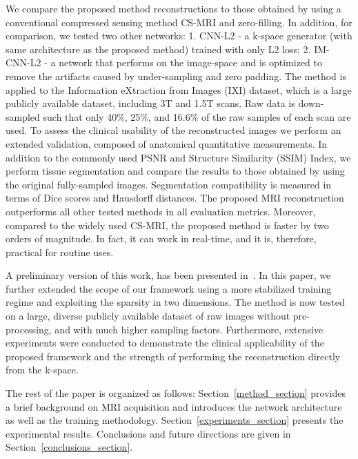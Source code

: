 \documentclass[10pt,journal,compsoc]{IEEEtran}
\begin{document}
We compare the proposed method reconstructions to those obtained by using a conventional compressed sensing method CS-MRI \cite{lustig2007sparse} and zero-filling. In addition, for comparison, we tested two other networks: 1. CNN-L2 - a k-space generator (with same architecture as the proposed method) trained with only L2 loss; 2. IM-CNN-L2 - a network that performs on the image-space and is optimized to remove the artifacts caused by under-sampling and zero padding.
The method is applied to the Information eXtraction from Images (IXI) dataset, which is a large publicly available dataset, including 3T and 1.5T scans. Raw data is down-sampled such that only 40\%, 25\%, and 16.6\% of the raw samples of each scan are used.
To assess the clinical usability of the reconstructed images we perform an extended validation, composed of anatomical quantitative measurements. In addition to the commonly used PSNR and Structure Similarity (SSIM) Index, we perform tissue segmentation and compare the results to those obtained by using the original fully-sampled images. Segmentation compatibility is measured in terms of Dice scores and Hausdorff distances.
The proposed MRI reconstruction outperforms all other tested methods in all evaluation metrics. Moreover, compared to the widely used CS-MRI, the proposed method is faster by two orders of magnitude. In fact, it can work in real-time, and it is, therefore, practical for routine uses.

A preliminary version of this work, has been presented in~\cite{shitrit2017accelerated}. In this paper, we further extended the scope of our framework using a more stabilized training regime and exploiting the sparsity in two dimensions. The method is now tested on a large, diverse publicly available dataset of raw images without pre-processing, and with much higher sampling factors. Furthermore, extensive experiments were conducted to demonstrate the clinical applicability of the proposed framework and the strength of performing the reconstruction directly from the k-space.

The rest of the paper is organized as follows: Section~\ref{method_section} provides a brief background on MRI acquisition and introduces the network architecture as well as the training methodology. Section~\ref{experiments_section} presents the experimental results. Conclusions and future directions are given in Section~\ref{conclusions_section}.
\end{document}
